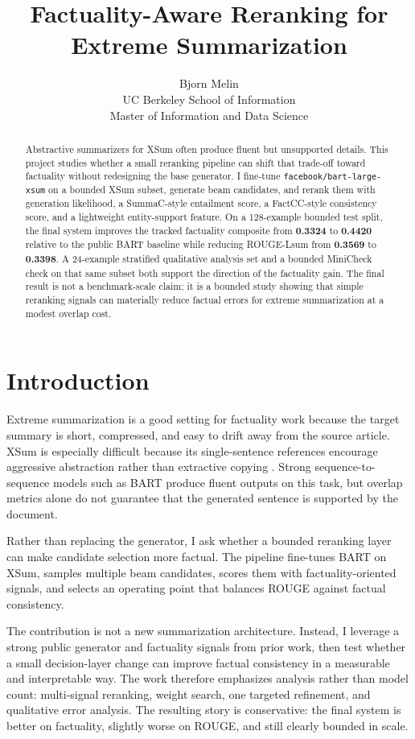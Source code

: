 \documentclass[11pt]{article}
\title{Factuality-Aware Reranking for Extreme Summarization}
\author{
  Bjorn Melin \\
  UC Berkeley School of Information \\
  Master of Information and Data Science
}
\begin{document}
\maketitle

\begin{abstract}
Abstractive summarizers for XSum often produce fluent but unsupported details.
This project studies whether a small reranking pipeline can shift that
trade-off toward factuality without redesigning the base generator.
I fine-tune \texttt{facebook/bart-large-xsum} on a bounded XSum subset,
generate beam candidates, and rerank them with generation likelihood, a
SummaC-style entailment score, a FactCC-style consistency score, and a
lightweight entity-support feature. On a 128-example bounded test split, the
final system improves the tracked factuality composite from \textbf{0.3324} to
\textbf{0.4420} relative to the public BART baseline while reducing ROUGE-Lsum
from \textbf{0.3569} to \textbf{0.3398}. A 24-example stratified qualitative
analysis set and a bounded MiniCheck check on that same subset both support the
direction of the factuality gain. The final result is not a
benchmark-scale claim; it is a bounded study showing that simple reranking
signals can materially reduce factual errors for extreme summarization at a
modest overlap cost.
\end{abstract}

\section{Introduction}

Extreme summarization is a good setting for factuality work because the target
summary is short, compressed, and easy to drift away from the source article.
XSum is especially difficult because its single-sentence references encourage
aggressive abstraction rather than extractive copying
\citep{narayan2018xsum}. Strong sequence-to-sequence models such as BART
\citep{lewis2020bart} produce fluent outputs on this task, but overlap metrics
alone do not guarantee that the generated sentence is supported by the
document.

Rather than replacing the generator, I ask whether a bounded reranking layer can make
candidate selection more factual. The pipeline fine-tunes BART on XSum,
samples multiple beam candidates, scores them with factuality-oriented
signals, and selects an operating point that balances ROUGE against factual
consistency.

The contribution is not a new summarization architecture. Instead, I leverage a
strong public generator and factuality signals from prior work, then test
whether a small decision-layer change can improve factual consistency in a
measurable and interpretable way. The work therefore emphasizes analysis rather
than model count: multi-signal reranking, weight search, one targeted
refinement, and qualitative error analysis. The resulting story is
conservative: the final system is better on factuality, slightly worse on
ROUGE, and still clearly bounded in scale.
\end{document}
